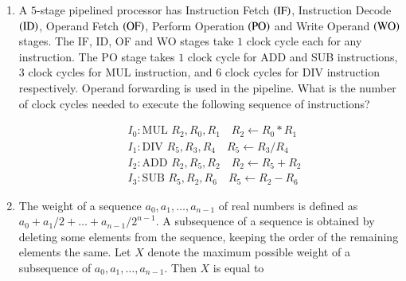 \documentclass[journal,12pt,onecolumn]{IEEEtran}
\theoremstyle{remark}
\begin{document}
\begin{enumerate}
		
		\hfill{}
		
		\begin{enumerate}
		\end{enumerate}
		
		\item A $5$-stage pipelined processor has Instruction Fetch $\left(\text{IF}\right)$, Instruction Decode $\left(\text{ID}\right)$, Operand Fetch $\left(\text{OF}\right)$, Perform Operation $\left(\text{PO}\right)$ and Write Operand $\left(\text{WO}\right)$ stages. The IF, ID, OF and WO stages take $1$ clock cycle each for any instruction. The PO stage takes $1$ clock cycle for ADD and SUB instructions, $3$ clock cycles for MUL instruction, and $6$ clock cycles for DIV instruction respectively. Operand forwarding is used in the pipeline. What is the number of clock cycles needed to execute the following sequence of instructions?
		
		\begin{align*}
			&I_0\colon \text{MUL } R_2, R_0, R_1 \quad R_2 \leftarrow R_0 * R_1\\
			&I_1\colon \text{DIV } R_5, R_3, R_4 \quad R_5 \leftarrow R_3 / R_4\\
			&I_2\colon \text{ADD } R_2, R_5, R_2 \quad R_2 \leftarrow R_5 + R_2\\
			&I_3\colon \text{SUB } R_5, R_2, R_6 \quad R_5 \leftarrow R_2 - R_6
		\end{align*}
		
		\hfill{\brak{\text{GATE CS 2010}}}
		
		\begin{enumerate}
			\begin{multicols}{4}
				\item $13$
				\item $15$
				\item $17$
				\item $19$
			\end{multicols}
		\end{enumerate}
		
		\item The weight of a sequence $a_0, a_1, \ldots, a_{n-1}$ of real numbers is defined as $a_0 + a_1/2 + \ldots + a_{n-1}/2^{n-1}$. A subsequence of a sequence is obtained by deleting some elements from the sequence, keeping the order of the remaining elements the same. Let $X$ denote the maximum possible weight of a subsequence of $a_0, a_1, \ldots, a_{n-1}$. Then $X$ is equal to
		

\end{enumerate}
\end{document}
